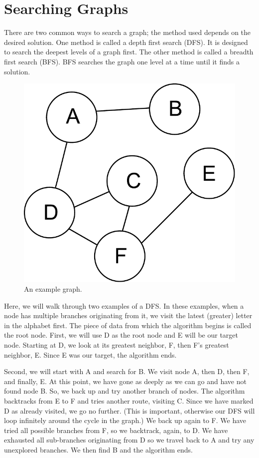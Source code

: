 \section*{Searching Graphs}
There are two common ways to search a graph;
the method used depends on the desired solution.
One method is called a depth first search (DFS).  It is designed to search the deepest levels of a graph first.
The other method is called a breadth first search (BFS).  BFS searches the graph one level at a time until it finds a solution.
\begin{figure}[h]
\centering
\includegraphics[width=.5\textwidth]{graph.pdf}
\caption{An example graph.}
\label{fig:bfs_dfs_graph}
\end{figure}


Here, we will walk through two examples of a DFS.
In these examples, when a node has multiple branches originating from it, we visit the latest (greater) letter in the alphabet first. The piece of data from which the algorithm begins is called the root node.
First, we will use D as the root node and E will be our target node.
Starting at D, we look at its greatest neighbor, F, then F's greatest neighbor, E.
Since E was our target, the algorithm ends.

Second, we will start with A and search for B.
We visit node A, then D, then F, and finally, E.
At this point, we have gone as deeply as we can go and have not found node B.
So, we back up and try another branch of nodes.
The algorithm backtracks from E to F and tries another route, visiting C.
Since we have marked D as already visited, we go no further.
(This is important, otherwise our DFS will loop infinitely around the cycle in the graph.)
We back up again to F.  We have tried all possible branches from F, so we backtrack, again, to D.
We have exhausted all sub-branches originating from D so we travel back to A and try any unexplored branches.
We then find B and the algorithm ends.

